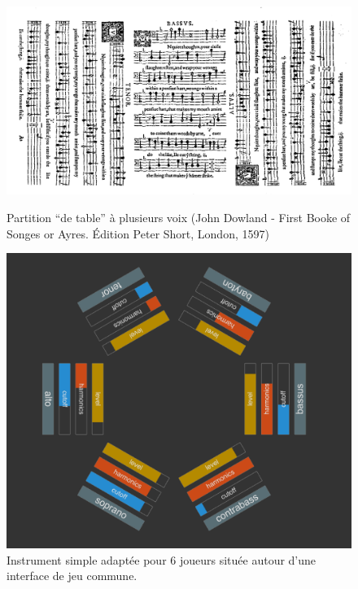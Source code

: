 \begin{figure}[!htbp]
	\captionsetup{format=plain}%
	\centering
	\begin{minipage}[t]{0.48\textwidth}
		\includegraphics[width=\linewidth]{gfx/06_visual_representation/Dowland-firstBookOfSonges.png}
		\caption[Partition ``de table'' à plusieurs voix]{Partition ``de table'' à plusieurs voix (John Dowland - First Booke of Songes or Ayres. Édition Peter Short, London, 1597)}
		\label{fig:visual_representation:table_music}
	\end{minipage}
	\hspace{.02\linewidth}
	\begin{minipage}[t]{0.48\textwidth}
	    \includegraphics[width=\linewidth]{gfx/06_visual_representation/mpTUI_multi-orientation.png}
		\caption[Instrument simple adapté pour 6 joueurs]{Instrument simple adaptée pour 6 joueurs située autour d'une interface de jeu commune.}
		\label{fig:visual_representation:multi_orientation}
	\end{minipage}
\end{figure}


